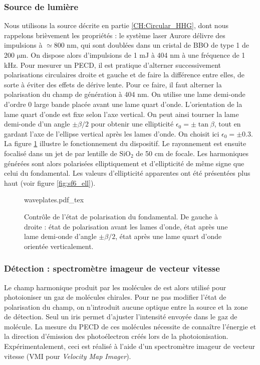 \subsubsection{Source de lumière}
Nous utilisons la source décrite en partie \ref{CH:Circular_HHG}, dont nous rappelons brièvement les propriétés : le système laser Aurore délivre des impulsions à $\simeq$800 nm, qui sont doublées dans un cristal de BBO de type 1 de 200 $\si{\micro\metre}$. On dispose alors d'impulsions de 1 mJ à 404 nm à une fréquence de 1 kHz. Pour mesurer un PECD, il est pratique d'alterner successivement polarisations circulaires droite et gauche et de faire la différence entre elles, de sorte à éviter des effets de dérive lente. Pour ce faire, il faut alterner la polarisation du champ de génération à 404 nm. On utilise une lame demi-onde d'ordre 0 large bande placée avant une lame quart d'onde. L'orientation de la lame quart d'onde est fixe selon l'axe vertical. On peut ainsi tourner la lame demi-onde d'un angle $\pm\beta/2$ pour obtenir une ellipticité $\epsilon_0 = \pm \tan\beta$, tout en gardant l'axe de l'ellipse vertical après les lames d'onde. On choisit ici $\epsilon_0 = \pm 0.3$. La figure \ref{fig:waveplates} illustre le fonctionnement du dispositif. Le rayonnement est ensuite focalisé dans un jet de  par lentille de $\text{SiO}_2$ de 50 cm de focale. Les harmoniques générées sont alors polarisées elliptiquement et d'ellipticité de même signe que celui du fondamental. Les valeurs d'ellipticité apparentes ont été présentées plus haut (voir figure \ref{fig:sf6_ell}).

\begin{figure}[!ht]
\centering
\def\svgwidth{0.7\columnwidth}
{waveplates.pdf_tex}
\caption{Contrôle de l'état de polarisation du fondamental. De gauche à droite : état de polarisation avant les lames d'onde, état après une lame demi-onde d'angle $\pm\beta/2$, état après une lame quart d'onde orientée verticalement.}
\label{fig:waveplates}
\end{figure}

\subsubsection{Détection : spectromètre imageur de vecteur vitesse}
Le champ harmonique produit par les molécules de  est alors utilisé pour photoioniser un gaz de molécules chirales. Pour ne pas modifier l'état de polarisation du champ, on n'introduit aucune optique entre la source et la zone de détection. Seul un iris permet d'ajuster l'intensité envoyée dans le gaz de molécule. La mesure du PECD de ces molécules nécessite de connaître l'énergie et la direction d'émission des photoélectron créés lors de la photoionisation. Expérimentalement, ceci est réalisé à l'aide d'un spectromètre imageur de vecteur vitesse (VMI pour \textit{Velocity Map Imager}). 

